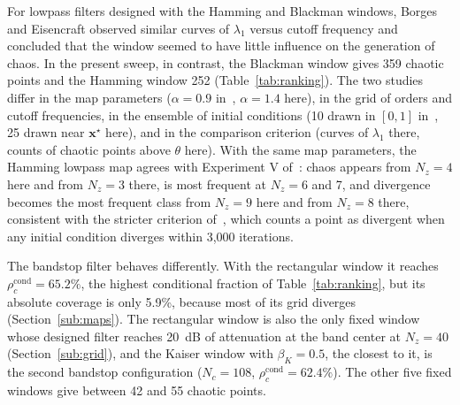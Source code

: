 \documentclass[journal]{IEEEtran}
\begin{document}
For lowpass filters designed with the Hamming and Blackman windows, Borges and
Eisencraft \cite{Borges2022sbrt} observed similar curves of $\lambda_1$ versus
cutoff frequency and concluded that the window seemed to have little influence
on the generation of chaos. In the present sweep, in contrast, the Blackman
window gives 359 chaotic points and the Hamming window 252
(Table~\ref{tab:ranking}). The two studies differ in the map parameters
($\alpha=0.9$ in~\cite{Borges2022sbrt}, $\alpha=1.4$ here), in the grid of
orders and cutoff frequencies, in the ensemble of initial conditions (10 drawn
in $[0,1]$ in~\cite{Borges2022sbrt}, 25 drawn near $\mathbf{x}^\star$ here), and
in the comparison criterion (curves of $\lambda_1$ there, counts of chaotic
points above $\theta$ here). With the same map parameters, the Hamming lowpass
map agrees with Experiment V of~\cite{BorgesCNSNS2024}: chaos appears from
$N_z=4$ here and from $N_z=3$ there, is most frequent at $N_z=6$ and 7, and
divergence becomes the most frequent class from $N_z=9$ here and from $N_z=8$
there, consistent with the stricter criterion of~\cite{BorgesCNSNS2024}, which
counts a point as divergent when any initial condition diverges within 3,000
iterations.

The bandstop filter behaves differently. With the rectangular window it reaches
$\rho_c^\text{cond}=65.2\%$, the highest conditional fraction of
Table~\ref{tab:ranking}, but its absolute coverage is only 5.9\%, because most
of its grid diverges (Section~\ref{sub:maps}). The rectangular window is also
the only fixed window whose designed filter reaches 20~dB of attenuation at the
band center at $N_z=40$ (Section~\ref{sub:grid}), and the Kaiser window with
$\beta_K=0.5$, the
closest to it, is the second bandstop configuration ($N_c=108$,
$\rho_c^\text{cond}=62.4\%$). The other five fixed windows give between 42 and
55 chaotic points.

\end{document}
